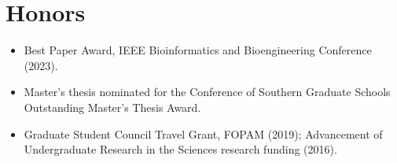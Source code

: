 \documentclass[11pt,letterpaper]{article}
\begin{document}
\section*{Honors}
\begin{itemize}
\item Best Paper Award, IEEE Bioinformatics and Bioengineering Conference (2023).
\item Master's thesis nominated for the Conference of Southern Graduate Schools Outstanding
Master's Thesis Award.
\item Graduate Student Council Travel Grant, FOPAM (2019); Advancement of Undergraduate Research
in the Sciences research funding (2016).
\end{itemize}
\end{document}
